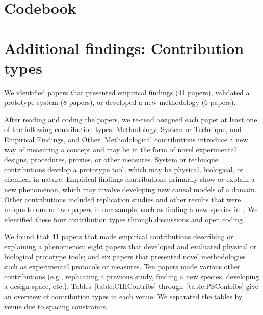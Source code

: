 
\clearpage
\section{Codebook}
\tableLitSurveyCodes

\section{Additional findings: Contribution types}
We identified papers that presented empirical findings (41 papers), validated a
prototype system (8 papers), or developed a new methodology (6 papers). 

After reading and coding the papers, we re-read assigned each paper at least one
of the following contribution types: Methodology, System or Technique, and
Empirical Findings, and Other. Methodological contributions introduce a new way
of measuring a concept and may be in the form of novel experimental designs,
procedures, proxies, or other measures. System or technique contributions
develop a prototype tool, which may be physical, biological, or chemical in
nature. Empirical findings contributions primarily show or explain a new
phenomenon, which may involve developing new causal models of a domain. Other
contributions included replication studies and other results that were unique to
one or two papers in our sample, such as finding a new species in~\cite{N1}. We
identified these four contribution types through discussions and open coding. 

We found that 41 papers that made empirical contributions describing or
explaining a phenomenon; eight papers that developed and evaluated physical or
biological prototype tools; and six papers that presented novel methodologies
such as experimental protocols or measures. Ten papers made various other
contributions (e.g., replicating a previous study, finding a new species,
developing a design space, etc.). Tables~\ref{table:CHIContribs}
through~\ref{table:PSContribs} give an overview of contribution types in each
venue. We separated the tables by venue due to spacing constraints. 

